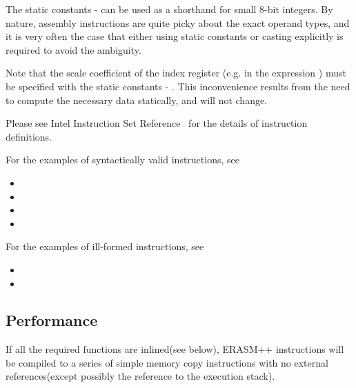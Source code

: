 \documentclass{article}
\begin{document}
The static constants - can be used as a shorthand for small
8-bit integers. By nature, assembly instructions are quite picky about
the exact operand types, and it is very often the case that either
using static constants or casting explicitly is required to avoid the
ambiguity.

Note that the scale coefficient of the index register (e.g.  in
the expression ) must be specified with the static
constants  - . This inconvenience results from the need to
compute the necessary data statically, and will not change.

Please see Intel  Instruction Set Reference~\cite{intel:insn_ref} for
the details of instruction definitions.

For the examples of syntactically valid instructions, see

\begin{itemize}
\item {}
\item {}
\item {}
\item {}
\end{itemize}

For the examples of ill-formed instructions, see

\begin{itemize}
\item {}
\item {}
\end{itemize}

\subsection{Performance}

If all the required functions are inlined(see below), ERASM++
instructions will be compiled to a series of simple memory copy
instructions with no external references(except possibly the reference
to the execution stack).
\end{document}
